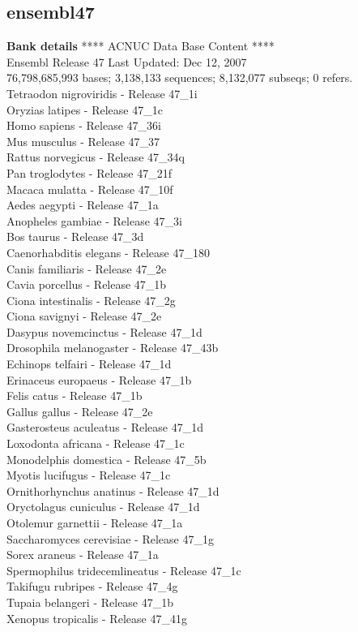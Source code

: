\documentclass{article}
\begin{document}
\begin{Schunk}
\section{ ensembl47 }
\textbf{Bank details}
             ****     ACNUC Data Base Content      ****\\
Ensembl Release 47	     		 Last Updated: Dec 12, 2007\\
76,798,685,993 bases; 3,138,133 sequences; 8,132,077 subseqs; 0 refers.\\
 Tetraodon nigroviridis - Release 47\_1i \\
 Oryzias latipes - Release 47\_1c \\
 Homo sapiens - Release 47\_36i \\
 Mus musculus - Release 47\_37 \\
 Rattus norvegicus - Release 47\_34q \\
 Pan troglodytes - Release 47\_21f \\
 Macaca mulatta - Release 47\_10f \\
 Aedes aegypti - Release 47\_1a \\
 Anopheles gambiae - Release 47\_3i \\
 Bos taurus - Release 47\_3d \\
 Caenorhabditis elegans - Release 47\_180 \\
 Canis familiaris - Release 47\_2e \\
 Cavia porcellus - Release 47\_1b \\
 Ciona intestinalis - Release 47\_2g \\
 Ciona savignyi - Release 47\_2e \\
 Dasypus novemcinctus - Release 47\_1d \\
 Drosophila melanogaster - Release 47\_43b \\
 Echinops telfairi - Release 47\_1d \\
 Erinaceus europaeus - Release 47\_1b \\
 Felis catus - Release 47\_1b \\
 Gallus gallus - Release 47\_2e \\
 Gasterosteus aculeatus - Release 47\_1d \\
 Loxodonta africana - Release 47\_1c \\
 Monodelphis domestica - Release 47\_5b \\
 Myotis lucifugus - Release 47\_1c \\
 Ornithorhynchus anatinus - Release 47\_1d \\
 Oryctolagus cuniculus - Release 47\_1d \\
 Otolemur garnettii - Release 47\_1a \\
 Saccharomyces cerevisiae - Release 47\_1g \\
 Sorex araneus - Release 47\_1a \\
 Spermophilus tridecemlineatus - Release 47\_1c \\
 Takifugu rubripes - Release 47\_4g \\
 Tupaia belangeri - Release 47\_1b \\
 Xenopus tropicalis - Release 47\_41g 


\end{Schunk}
\end{document}
